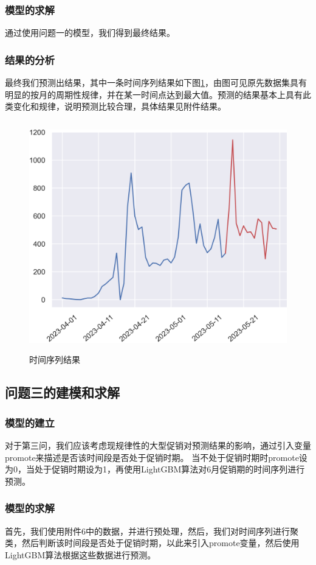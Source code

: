 \documentclass[withoutpreface,bwprint]{cumcmthesis}
\begin{document}
\subsubsection{模型的求解}
  通过使用问题一的模型，我们得到最终结果。
\subsubsection{结果的分析}
  最终我们预测出结果，其中一条时间序列结果如下图\ref{第二问时间序列结果}，由图可见原先数据集具有明显的按月的周期性规律，并在某一时间点达到最大值。预测的结果基本上具有此类变化和规律，说明预测比较合理，具体结果见附件结果。
  \begin{figure}[htbp]
     \centering
     \includegraphics[width=15cm,height=10cm]{figure/第二问时间序列结果.png}%
     \caption{时间序列结果}
     \label{第二问时间序列结果}
    \end{figure}

\subsection{问题三的建模和求解}
\subsubsection{模型的建立}
  对于第三问，我们应该考虑现规律性的大型促销对预测结果的影响，通过引入变量promote来描述是否该时间段是否处于促销时期。
当不处于促销时期时promote设为0，当处于促销时期设为1，再使用LightGBM算法对6月促销期的时间序列进行预测。
\subsubsection{模型的求解}
  首先，我们使用附件6中的数据，并进行预处理，然后，我们对时间序列进行聚类，然后判断该时间段是否处于促销时期，以此来引入promote变量，然后使用LightGBM算法根据这些数据进行预测。
\end{document}

